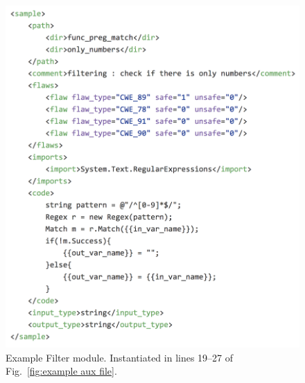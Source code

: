 \documentclass[12pt]{article}
\begin{document}
\begin{figure}[htbp]
  \includegraphics[width=\linewidth]{fig_Filter_file.png}
  \caption{Example Filter module. Instantiated in lines 19--27 of Fig.~\ref{fig:example aux file}.}
  \label{fig:example filter file}
\end{figure}
\end{document}
